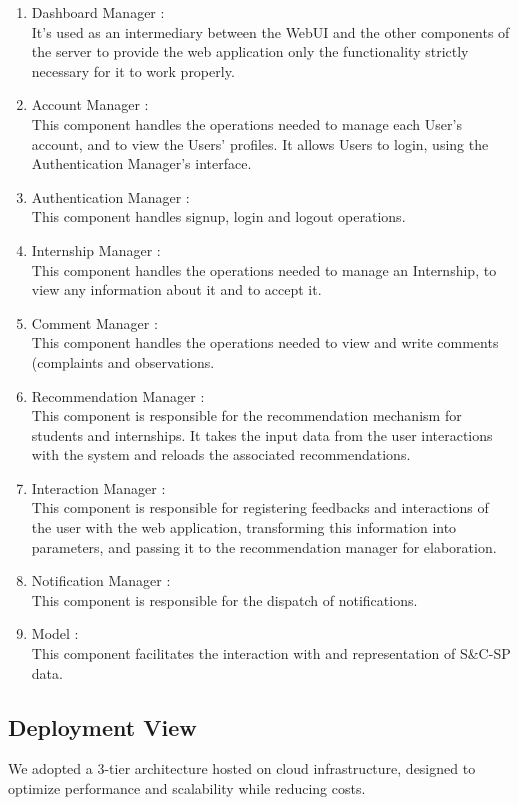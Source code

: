 \documentclass[a4paper,12pt]{article}
\begin{document}
\begin{enumerate}
    \item {Dashboard Manager} :
    \\It's used as an intermediary between the WebUI and the
    other components of the server to provide the web application only the functionality
    strictly necessary for it to work properly.
    \item {Account Manager} :
    \\This component handles the operations needed to manage each User's account, and to view the Users' profiles. It allows Users to login, using the Authentication Manager's interface.
    \item {Authentication Manager} :
    \\This component handles signup, login and logout operations.
    \item {Internship Manager} :
    \\This component handles the operations needed to manage an Internship, to view any information about it and to accept it.
    \item {Comment Manager} :
    \\This component handles the operations needed to view and write comments (complaints and observations.
    \item {Recommendation Manager} :
    \\This component is responsible for the recommendation mechanism for students and internships. It takes the input data from the user interactions with the system and reloads the associated recommendations.
    \item {Interaction Manager} :
    \\This component is responsible for registering feedbacks and interactions of the user with the web application, transforming this information into parameters, and passing it to the recommendation manager for elaboration.
    \item {Notification Manager} :
    \\This component is responsible for the dispatch of notifications.
    \item {Model} :
    \\This component facilitates the interaction with and representation of S\&C-SP data.
\end{enumerate}
\subsection{Deployment View}
We adopted a 3-tier architecture hosted on cloud infrastructure, designed to optimize performance and scalability while reducing costs.
\end{document}
